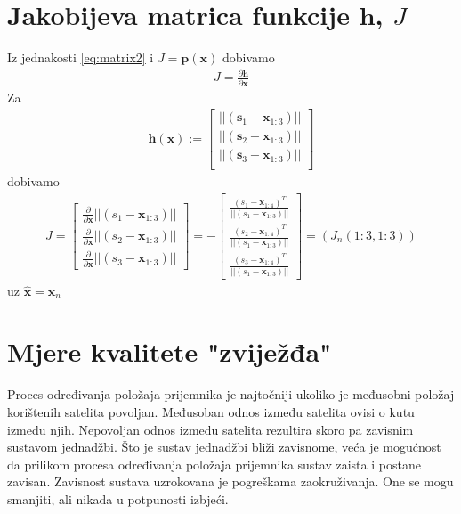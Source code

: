 \documentclass[a4paper,twoside,12pt]{memoir} %
\begin{document}
\chapter{Jakobijeva matrica funkcije $\mathbf{h}$, $J$}
Iz jednakosti \ref{eq:matrix2} i $J = \mathbf{p}(\mathbf{x})$ dobivamo
\begin{align}
J = \frac{\partial \mathbf{h}}{\partial \mathbf{x}}
\end{align}
Za 
\begin{align}
\mathbf{h} (\mathbf{x}) := 
\begin{bmatrix}
||(\mathbf{s}_1-\mathbf{x}_{1:3})|| \\
||(\mathbf{s}_2-\mathbf{x}_{1:3})|| \\
||(\mathbf{s}_3-\mathbf{x}_{1:3})||\\
\end{bmatrix} 
\end{align}
dobivamo
\begin{align}
J = \begin{bmatrix}
\frac{\partial}{\partial \mathbf{x}} ||(s_1-\mathbf{x}_{1:3})|| \\
\frac{\partial}{\partial \mathbf{x}} ||(s_2-\mathbf{x}_{1:3})||\\
\frac{\partial}{\partial \mathbf{x}} ||(s_3-\mathbf{x}_{1:3})|| 
\end{bmatrix}%
= - \begin{bmatrix}
\frac{(s_1-\mathbf{x}_{1:4})^T}{||(s_1-\mathbf{x}_{1:3})||} \\
\frac{(s_2-\mathbf{x}_{1:4})^T}{||(s_1-\mathbf{x}_{1:3})||}\\
\frac{(s_3-\mathbf{x}_{1:4})^T}{||(s_1-\mathbf{x}_{1:3})||} 
\end{bmatrix} = (J_n(1:3,1:3))
\end{align}
uz $\hat{\mathbf{x}} = \mathbf{x}_n$
\chapter{Mjere kvalitete "zviježđa"}\label{appendix:DOP}
Proces određivanja položaja prijemnika je najtočniji ukoliko je međusobni položaj korištenih satelita povoljan.
Međusoban odnos između satelita ovisi o kutu između njih.
Nepovoljan odnos između satelita rezultira skoro pa zavisnim sustavom jednadžbi. 
Što je sustav jednadžbi bliži zavisnome, veća je mogućnost da prilikom procesa određivanja položaja prijemnika sustav zaista i postane zavisan. Zavisnost sustava uzrokovana je pogreškama zaokruživanja. One se mogu smanjiti, ali nikada u potpunosti izbjeći.
\end{document}

